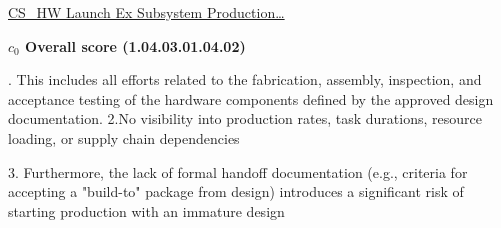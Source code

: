 % 


\begin{frame}{\href{run:../local/source-docs/1.04.03.01.04.02.pdf}{CS\_HW Launch Ex Subsystem Production\ldots{}}}
\centering
{}
\par
\vspace{0.75em}
\textbf{\small{\(c_0\) Overall score {\tiny (1.04.03.01.04.02)}}}\\\par
\vspace{0.5em}
\begin{minipage}{0.85\textwidth}
\raggedright
\fontsize{7}{9}. This includes all efforts related to the fabrication, assembly, inspection, and acceptance testing of the hardware components defined by the approved design documentation. 2.No visibility into production rates, task durations, resource loading, or supply chain dependencies\par\vspace{0.5em}3. Furthermore, the lack of formal handoff documentation (e.g., criteria for accepting a "build-to" package from design) introduces a significant risk of starting production with an immature design\par
\end{minipage}
\end{frame}
%
